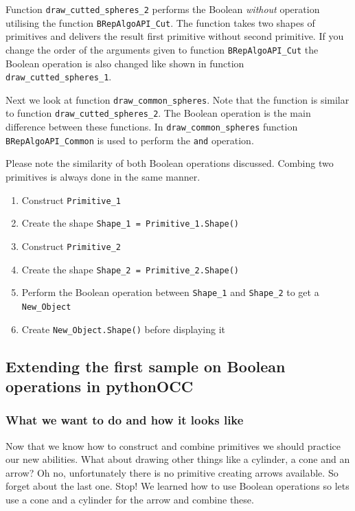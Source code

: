 Function {\tt draw\_cutted\_spheres\_2} performs the Boolean {\it without} operation utilising the function {\tt BRepAlgoAPI\_Cut}.
The function takes two shapes of primitives and delivers the result first primitive without second primitive.
If you change the order of the arguments given to function {\tt BRepAlgoAPI\_Cut} the Boolean operation is also changed like shown in function {\tt draw\_cutted\_spheres\_1}.

Next we look at function {\tt draw\_common\_spheres}.
Note that the function is similar to function {\tt draw\_cutted\_spheres\_2}.
The Boolean operation is the main difference between these functions.
In {\tt draw\_common\_spheres} function {\tt BRepAlgoAPI\_Common} is used to perform the {\tt and} operation.

Please note the similarity of both Boolean operations discussed.
Combing two primitives is always done in the same manner.
\begin{enumerate}
\item Construct {\tt Primitive\_1}
\item Create the shape {\tt Shape\_1 = Primitive\_1.Shape()}
\item Construct {\tt Primitive\_2}
\item Create the shape {\tt Shape\_2 = Primitive\_2.Shape()}
\item Perform the Boolean operation between {\tt Shape\_1} and  {\tt Shape\_2} to get a {\tt New\_Object}
\item Create {\tt New\_Object.Shape()} before displaying it
\end{enumerate}

\subsection{Extending the first sample on Boolean operations in pythonOCC}
\subsubsection{What we want to do and how it looks like}
Now that we know how to construct and combine primitives we should practice our new abilities.
What about drawing other things like a cylinder, a cone and an arrow?
Oh no, unfortunately there is no primitive creating arrows available.
So forget about the last one.
Stop!
We learned how to use Boolean operations so lets use a cone and a cylinder for the arrow and combine these.

